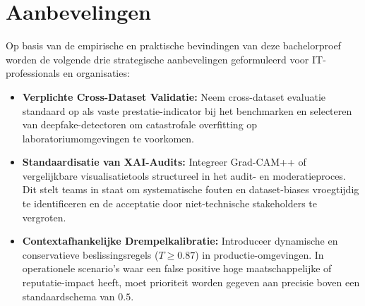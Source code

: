 \section{Aanbevelingen}

Op basis van de empirische en praktische bevindingen van deze bachelorproef worden de volgende drie strategische aanbevelingen geformuleerd voor IT-professionals en organisaties:
\begin{itemize}
    \item \textbf{Verplichte Cross-Dataset Validatie:} Neem cross-dataset evaluatie standaard op als vaste prestatie-indicator bij het benchmarken en selecteren van deepfake-detectoren om catastrofale overfitting op laboratoriumomgevingen te voorkomen.
    \item \textbf{Standaardisatie van XAI-Audits:} Integreer Grad-CAM++ of vergelijkbare visualisatietools structureel in het audit- en moderatieproces. Dit stelt teams in staat om systematische fouten en dataset-biases vroegtijdig te identificeren en de acceptatie door niet-technische stakeholders te vergroten.
    \item \textbf{Contextafhankelijke Drempelkalibratie:} Introduceer dynamische en conservatieve beslissingsregels ($T \ge 0.87$) in productie-omgevingen. In operationele scenario's waar een false positive hoge maatschappelijke of reputatie-impact heeft, moet prioriteit worden gegeven aan precisie boven een standaardschema van $0.5$.
\end{itemize}